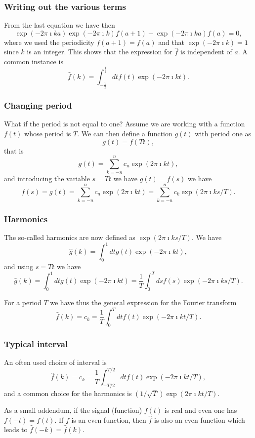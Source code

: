 \documentclass{beamer}
\begin{document}
\begin{frame}
\frametitle{Writing out the various terms}

From the last equation we have then
\[
\exp{(-2\pi\imath ka)}\exp{(-2\pi\imath k)}f(a+1)-\exp{(-2\pi\imath ka)}f(a)=0,
\]
where we used the periodicity  $f(a+1)=f(a)$ and that $\exp{(-2\pi\imath k)}=1$ since $k$ is an integer.
This shows that the expression for $\hat{f}$ is independent of $a$. A common instance is
\[
\hat{f}(k)=\int_{-\frac{1}{2}}^{\frac{1}{2}} dt f(t)\exp{(-2\pi\imath kt)}.
\]
\end{frame}

\begin{frame}
\frametitle{Changing period}

What if the period is not equal to one? Assume we are working with a
function $f(t)$ whose period is $T$. We can then define a function
$g(t)$ with period one as
\[
g(t) = f(Tt),
\]
that is 
\[
g(t) =\sum_{k=-n}^{n}c_{n}\exp{(2\pi\imath kt)}, 
\]
and introducing the variable $s=Tt$ we have $g(t)=f(s)$ we have
\[
f(s) = g(t)=\sum_{k=-n}^{n}c_{n}\exp{(2\pi\imath kt)}=\sum_{k=-n}^{n}c_{k}\exp{(2\pi\imath ks/T)}. 
\]
\end{frame}

\begin{frame}
\frametitle{Harmonics}

The so-called harmonics are now defined as $\exp{(2\pi\imath ks/T)}$.
We have 
\[
\hat{g}(k)=\int_0^1 dt g(t)\exp{(-2\pi\imath kt)},
\]
and using $s=Tt$ we have
\[
\hat{g}(k)=\int_0^1 dt g(t)\exp{(-2\pi\imath kt)}=\frac{1}{T}\int_0^T ds f(s)\exp{(-2\pi\imath ks/T)}.
\]

For a period $T$ we have thus the general expression for the Fourier transform
\[
\hat{f}(k)=c_k=\frac{1}{T}\int_0^T dt f(t)\exp{(-2\pi\imath kt/T)}.
\]
\end{frame}

\begin{frame}
\frametitle{Typical interval}

An often used choice of interval is
\[
\hat{f}(k)=c_k=\frac{1}{T}\int_{-T/2}^{T/2} dt f(t)\exp{(-2\pi\imath kt/T)},
\]
and a common choice for the harmonics is $(1/\sqrt{T})\exp{(2\pi\imath kt/T)}$.

As a small addendum, if the signal (function) $f(t)$ is real and even one has $f(-t)=f(t)$. If $f$ is an even function, then $\hat{f}$ is also an even function which leads to $\hat{f}(-k)=\hat{f}(k)$.
\end{frame}
\end{document}
